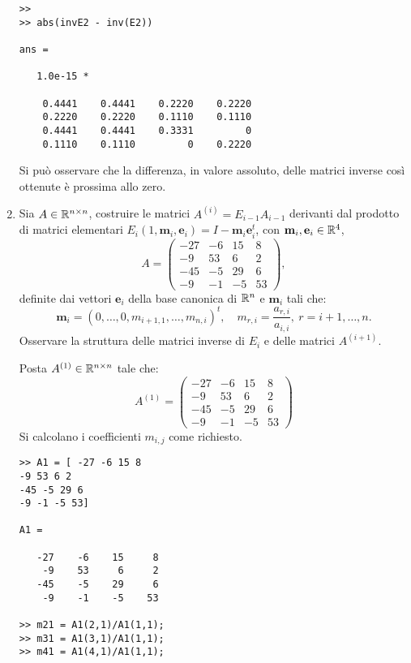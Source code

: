 \begin{enumerate}
\begin{svol}
\begin{codice}
\begin{verbatim}
>>
>> abs(invE2 - inv(E2))

ans =

   1.0e-15 *

    0.4441    0.4441    0.2220    0.2220
    0.2220    0.2220    0.1110    0.1110
    0.4441    0.4441    0.3331         0
    0.1110    0.1110         0    0.2220

\end{verbatim}
\end{codice}
Si può osservare che la differenza, in valore assoluto, delle matrici
inverse così ottenute è prossima allo zero.
\end{svol}

\item Sia $A \in \mathbb{R}^{n \times n}$, costruire le matrici $A^{(i)} = E_{i-1}A_{i-1}$
derivanti dal prodotto di matrici elementari $E_i(1,\mathbf{m}_i,\mathbf{e}_i)
= I - \mathbf{m}_i\mathbf{e}_i^t$, con $\mathbf{m}_i, \mathbf{e}_i \in \mathbb{R}^4$,
\[
A = \left(
\begin{array}{cccc}
-27 & -6 & 15 & 8 \\
-9 & 53 & 6 & 2 \\
-45 & -5 & 29 & 6 \\
-9 & -1 & -5 & 53
\end{array}
\right),
\]
definite dai vettori $\mathbf{e}_i$ della base canonica di $\mathbb{R}^n$ e 
$\mathbf{m}_i$ tali che:
\[
\mathbf{m}_i = \left( 0, \ldots, 0, m_{i+1,1}, \ldots, m_{n,i}\right)^t, \quad
m_{r,i} = \frac{a_{r,i}}{a_{i,i}},\ r = i+1, \ldots, n.
\]
Osservare la struttura delle matrici inverse di $E_i$ e delle matrici 
$A^{(i+1)}$.

\begin{svol}
Posta $A^{(1)} \in \mathbb{R}^{n \times n}$ tale che:
\[
A^{(1)} = \left(
\begin{array}{cccc}
-27 & -6 & 15 & 8 \\
-9 & 53 & 6 & 2 \\
-45 & -5 & 29 & 6 \\
-9 & -1 & -5 & 53
\end{array}
\right)
\]
Si calcolano i coefficienti $m_{i,j}$ come richiesto.
\begin{codice}
\begin{verbatim}
>> A1 = [ -27 -6 15 8
-9 53 6 2
-45 -5 29 6
-9 -1 -5 53]

A1 =

   -27    -6    15     8
    -9    53     6     2
   -45    -5    29     6
    -9    -1    -5    53

>> m21 = A1(2,1)/A1(1,1);
>> m31 = A1(3,1)/A1(1,1);
>> m41 = A1(4,1)/A1(1,1);



\end{verbatim}
\end{codice}
\end{svol}
\end{enumerate}
